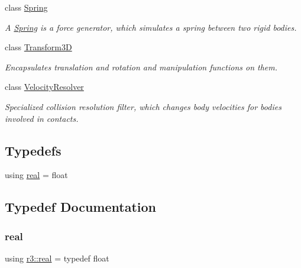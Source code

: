 \begin{DoxyCompactItemize}
class \mbox{\hyperlink{classr3_1_1_spring}{Spring}}
\begin{DoxyCompactList}\small\item\em A \mbox{\hyperlink{classr3_1_1_spring}{Spring}} is a force generator, which simulates a spring between two rigid bodies. \end{DoxyCompactList}\item 
class \mbox{\hyperlink{classr3_1_1_transform3_d}{Transform3D}}
\begin{DoxyCompactList}\small\item\em Encapsulates translation and rotation and manipulation functions on them. \end{DoxyCompactList}\item 
class \mbox{\hyperlink{classr3_1_1_velocity_resolver}{Velocity\+Resolver}}
\begin{DoxyCompactList}\small\item\em Specialized collision resolution filter, which changes body velocities for bodies involved in contacts. \end{DoxyCompactList}\end{DoxyCompactItemize}
\subsection*{Typedefs}
\begin{DoxyCompactItemize}
\item 
using \mbox{\hyperlink{namespacer3_ab2016b3e3f743fb735afce242f0dc1eb}{real}} = float
\end{DoxyCompactItemize}


\subsection{Typedef Documentation}
\mbox{\label{namespacer3_ab2016b3e3f743fb735afce242f0dc1eb}} 
\subsubsection{\texorpdfstring{real}{real}}
{\footnotesize\ttfamily using \mbox{\hyperlink{namespacer3_ab2016b3e3f743fb735afce242f0dc1eb}{r3\+::real}} = typedef float}

